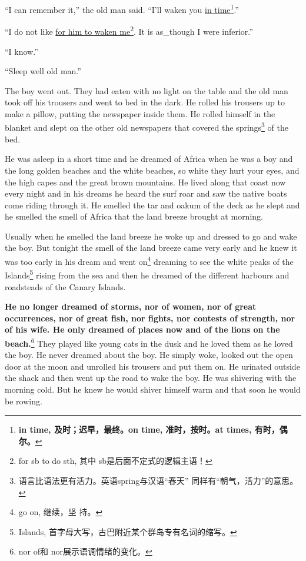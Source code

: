 ``I can remember it,'' the old man said. ``I'll \gls{waken} you \uline{in
  time}\footnote{\textbf{in time, 及时；迟早，最终。on time, 准时，按时。at times, 有时，偶尔。}}.''

``I do not like \uline{for him to waken me}\footnote{for sb to do sth, 其中
  sb是后面不定式的逻辑主语！}. It is \gls{as_though} I were \gls{inferior}.''

``I know.''

``Sleep well old man.''

The boy went out. They had eaten with no light on the table and the old man
took off his trousers and went to bed in the dark. He \gls{rolled} his
trousers up to make a \gls{pillow}, putting the newspaper inside them. He
rolled himself in the blanket and slept on the other old newspapers that
covered the springs\footnote{语言比语法更有活力。英语spring与汉语“春天”
  同样有“朝气，活力”的意思。} of the bed.

He was asleep in a short time and he dreamed of \gls{Africa} when he was a
boy and the long golden beaches and the white beaches, so white they hurt
your eyes, and the high capes and the great brown mountains. He lived along
that coast now every night and in his dreams he heard the \gls{surf}
\gls{roar} and saw the \gls{native} boats come riding through it. He smelled
the \gls{tar} and \gls{oakum} of the \gls{deck} as he slept and he smelled
the smell of Africa that the land breeze brought at morning.

Usually when he smelled the land breeze he woke up and dressed to go and
wake the boy. But tonight the smell of the land breeze came very early and
he knew it was too early in his dream and went on\footnote{go on, 继续，坚
  持。} dreaming to see the white \glspl{peak} of the
Islands\footnote{Islands, 首字母大写，古巴附近某个群岛专有名词的缩写。} rising from
the sea and then he dreamed of the different harbours and roadsteads of the
Canary Islands.

\textbf{He no longer dreamed of storms, nor of women, nor of great
  \glspl{occurrence}, nor of great fish, nor fights, nor contests of
  \gls{strength}, nor of his wife. He only dreamed of places now and of the
  lions on the beach.}\footnote{nor of和 nor展示语调情绪的变化。} They
played like young cats in the \gls{dusk} and he loved them as he loved the boy. He
never dreamed about the boy. He simply woke, looked out the open door at the
moon and unrolled his trousers and put them on. He \gls{urinated} outside
the shack and then went up the road to wake the boy. He was shivering with
the morning cold. But he knew he would shiver himself warm and that soon he
would be rowing.

